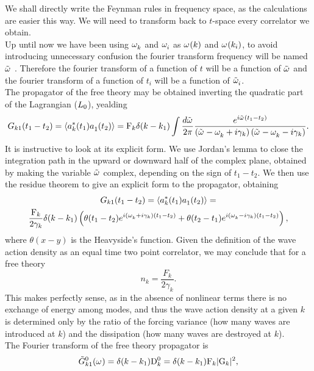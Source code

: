 We shall directly write the Feynman rules in frequency space, as the calculations are easier this way. We will need to transform back to $t$-space every 
correlator we obtain.\\
Up until now we have been using $\omega^{}_k$ and $\omega^{}_i$ as $\omega^{}(k)$ and $\omega^{}(k_i)$, to avoid introducing unnecessary confusion the 
fourier transform frequency will be named $\tilde{\omega}^{}$ . Therefore the fourier transform of a function of $t$ will be a function of $\tilde{\omega}^{}$ and the fourier 
transform of a function of $t_i$ will be a function of $\tilde{\omega}^{}_i$. \\
The propagator of the free theory may be obtained inverting the quadratic part of the Lagrangian ($L_0$), yealding 
\begin{equation}
    G_{k1}(t_1 - t_2) = \langle a_k^*(t_1)a_1^{}(t_2)\rangle = \mathrm{F}_k \delta(k-k_1)\int \frac{d \tilde{\omega}^{}}{2\pi}\frac{e^{i\tilde{\omega}^{}(t_1 - t_2)}}
    {\left(\tilde{\omega}^{} -\omega^{}_k + i\gamma_k \right)\left(\tilde{\omega}^{} -\omega^{}_k-i \gamma_k\right)}. 
    \label{propspace}
\end{equation}
It is instructive to look at its explicit form. We use Jordan's lemma to close the integration path in the upward or downward half of the complex plane, obtained by 
making the variable $\tilde{\omega}^{}$ complex, depending on the sign of $t_1 - t_2$. We then use the residue theorem to give an explicit form to the propagator, obtaining
\begin{multline}
    G_{k1}(t_1 - t_2) = \langle a_k^*(t_1)a_1^{}(t_2)\rangle = \\
    \frac{\mathrm{F}_k}{2\gamma_k}\delta(k-k_1)\left(\theta(t_1-t_2)e^{i(\omega^{}_k + i\gamma_k)(t_1 - t_2)}
    +\theta(t_2-t_1)e^{i(\omega^{}_k - i\gamma_k)(t_1 - t_2)}\right),
\end{multline}  
where $\theta(x-y)$ is the Heavyside's function. Given the definition of the wave action density as an equal time two point correlator, we may conclude that for a 
free theory
\begin{equation}
    n_k = \frac{F_k}{2\gamma_k}.
    \label{freenwav}
\end{equation}
This makes perfectly sense, as in the absence of nonlinear terms there is no exchange of energy among modes, and thus the wave action density at a given $k$ is determined
only by the ratio of the forcing variance (how many waves are introduced at $k$) and the dissipation (how many waves are destroyed at $k$). \\
The Fourier transform of the free theory propagator is
\begin{equation}
    \tilde{G}^0_{k1}(\omega^{})=\delta(k-k_1)\mathrm{D}^0_k=\delta(k-k_1)\mathrm{F}_k|\mathrm{G}_k|^2,
    \label{prop}
\end{equation}  
